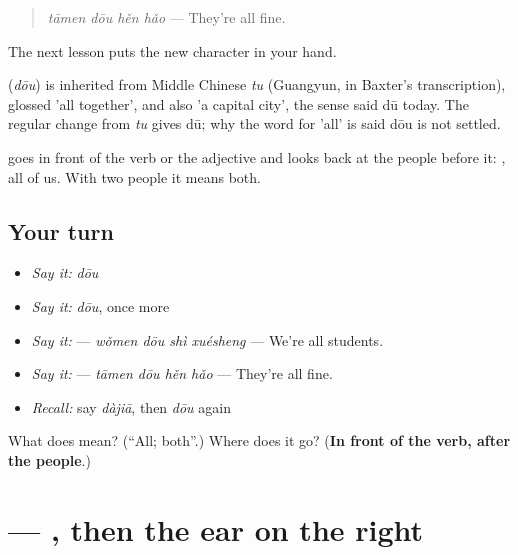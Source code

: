 \begin{quote}
\textbf{} \emph{tāmen dōu hěn hǎo} — They're all fine.
\end{quote}

The next lesson puts the new character in your hand.

\begin{cousinweb}
\textbf{} (\emph{dōu}) is inherited from Middle Chinese \emph{tu} (Guangyun, in Baxter's transcription), glossed 'all together', and also 'a capital city', the sense said dū today. The regular change from \emph{tu} gives dū; why the word for 'all' is said dōu is not settled.
\end{cousinweb}

\begin{grammarlens}[title={What you've built}]
 goes in front of the verb or the adjective and looks back at the people before it: , all of us. With two people it means both.
\end{grammarlens}

\subsection*{Your turn}
\begin{itemize}
\raggedright
  \item \emph{Say it:} \emph{dōu}
  \item \emph{Say it:} \emph{dōu}, once more
  \item \emph{Say it:}  — \emph{wǒmen dōu shì xuésheng} — We're all students.
  \item \emph{Say it:}  — \emph{tāmen dōu hěn hǎo} — They're all fine.
  \item \emph{Recall:} say \emph{dàjiā}, then \emph{dōu} again
\end{itemize}

\begin{tcolorbox}[breakable,colback=teal!4,colframe=teal!35!black,title={Before you move on}]
What does  mean? (\textquotedblleft{}All; both\textquotedblright{}.) Where does it go? (\textbf{In front of the verb, after the people}.)
\end{tcolorbox}
\section[\texorpdfstring{\zh{都} (dōu)}{都 (dōu)}]{ — , then the ear on the right}

\label{lesson:ZH-W94-dou}



